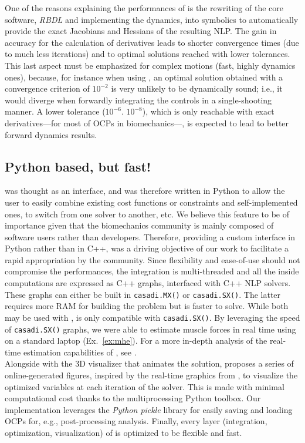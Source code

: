 One of the reasons explaining the performances of \bioptim is the rewriting of the core software, \textit{RBDL} \cite{felis2016rbdl} and \biorbd implementing the dynamics, into \casadi symbolics to automatically provide the exact Jacobians and Hessians of the resulting NLP.  
The gain in accuracy for the calculation of derivatives leads to shorter convergence times (due to much less iterations) and to optimal solutions reached with lower tolerances.
This last aspect must be emphasized for complex motions (fast, highly dynamics ones), because, for instance when using \ipopt, an optimal solution obtained with a convergence criterion of $10^{-2}$ is very unlikely to be dynamically sound; 
i.e., it would diverge when forwardly integrating the controls in a single-shooting manner. 
A lower tolerance ($10^{-6}$. $10^{-8}$), which is only reachable with exact derivatives---for most of OCPs in biomechanics---, is expected to lead to better forward dynamics results.

\subsection{Python based, but fast!}

\bioptim was thought as an interface, and was therefore written in Python to allow the user to easily combine existing cost functions or constraints and self-implemented ones, to switch from one solver to another, etc. 
We believe this feature to be of importance given that the biomechanics community is mainly composed of software users rather than developers.
Therefore, providing a custom interface in Python rather than in C++, was a driving objective of our work to facilitate a rapid appropriation by the community.
Since flexibility and ease-of-use should not compromise the performances, the integration is multi-threaded and all the inside computations are expressed as C++ \casadi graphs, interfaced with C++ NLP solvers.
These graphs can either be built in \texttt{casadi.MX()} or \texttt{casadi.SX()}.
The latter requires more RAM for building the problem but is faster to solve.
While both may be used with \ipopt, \acados is only compatible with \texttt{casadi.SX()}.
By leveraging the speed of \texttt{casadi.SX()} graphs, we were able to estimate muscle forces in real time using \acados on a standard laptop (Ex.~\ref{ex:mhe}).
For a more in-depth analysis of the real-time estimation capabilities of \bioptim, see \cite{bailly2020real}.\\
Alongside with the 3D visualizer \bioviz that animates the solution, \bioptim proposes a series of online-generated figures, inspired by the  real-time graphics from \muscodii \cite{leineweber2003efficient1, leineweber2003efficient2}, to visualize the optimized variables at each iteration of the solver.
This is made with minimal computational cost thanks to the multiprocessing Python toolbox. 
Our implementation leverages the \textit{Python pickle} library for easily saving and loading OCPs for, e.g., post-processing analysis.
Finally, every layer (integration, optimization, visualization) of \bioptim is optimized to be flexible and fast.

